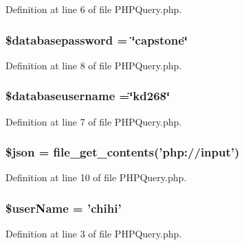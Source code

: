 Definition at line 6 of file P\-H\-P\-Query.\-php.

\hypertarget{_p_h_p_query_8php_a1a07536b6a5f43f2d8f826bd2ee6c91a}{
\subsubsection[{\$databasepassword}]{\setlength{\rightskip}{0pt plus 5cm}\$databasepassword = \char`\"{}capstone\char`\"{}}}\label{_p_h_p_query_8php_a1a07536b6a5f43f2d8f826bd2ee6c91a}


Definition at line 8 of file P\-H\-P\-Query.\-php.

\hypertarget{_p_h_p_query_8php_a251bf75f510d7c8b556c65d7c30e911f}{
\subsubsection[{\$databaseusername}]{\setlength{\rightskip}{0pt plus 5cm}\$databaseusername =\char`\"{}kd268\char`\"{}}}\label{_p_h_p_query_8php_a251bf75f510d7c8b556c65d7c30e911f}


Definition at line 7 of file P\-H\-P\-Query.\-php.

\hypertarget{_p_h_p_query_8php_acedd13b51401130848ce18f4d5c52605}{
\subsubsection[{\$json}]{\setlength{\rightskip}{0pt plus 5cm}\$json = file\-\_\-get\-\_\-contents('php\-://input')}}\label{_p_h_p_query_8php_acedd13b51401130848ce18f4d5c52605}


Definition at line 10 of file P\-H\-P\-Query.\-php.

\hypertarget{_p_h_p_query_8php_aff20833df389a26c0f9384512eec4a68}{
\subsubsection[{\$user\-Name}]{\setlength{\rightskip}{0pt plus 5cm}\$user\-Name = 'chihi'}}\label{_p_h_p_query_8php_aff20833df389a26c0f9384512eec4a68}


Definition at line 3 of file P\-H\-P\-Query.\-php.

